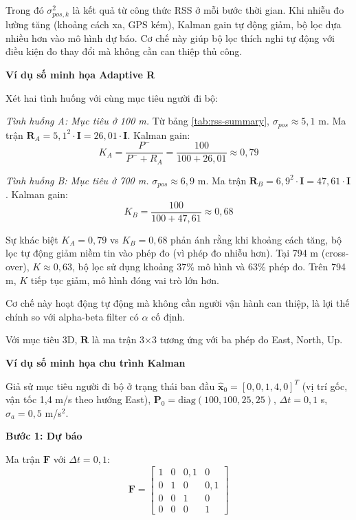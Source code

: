 Trong đó $\sigma_{pos,k}^2$ là kết quả từ công thức RSS ở mỗi bước thời gian. Khi nhiễu đo lường tăng (khoảng cách xa, GPS kém), Kalman gain tự động giảm, bộ lọc dựa nhiều hơn vào mô hình dự báo. Cơ chế này giúp bộ lọc thích nghi tự động với điều kiện đo thay đổi mà không cần can thiệp thủ công.

\textbf{Ví dụ số minh họa Adaptive R}

Xét hai tình huống với cùng mục tiêu người đi bộ:

\textit{Tình huống A: Mục tiêu ở 100 m.} Từ bảng \ref{tab:rss-summary}, $\sigma_{pos} \approx 5{,}1$ m. Ma trận $\mathbf{R}_A = 5{,}1^2 \cdot \mathbf{I} = 26{,}01 \cdot \mathbf{I}$. Kalman gain:
\begin{equation}
    K_A = \frac{P^-}{P^- + R_A} = \frac{100}{100 + 26{,}01} \approx 0{,}79
\end{equation}

\textit{Tình huống B: Mục tiêu ở 700 m.} $\sigma_{pos} \approx 6{,}9$ m. Ma trận $\mathbf{R}_B = 6{,}9^2 \cdot \mathbf{I} = 47{,}61 \cdot \mathbf{I}$. Kalman gain:
\begin{equation}
    K_B = \frac{100}{100 + 47{,}61} \approx 0{,}68
\end{equation}

Sự khác biệt $K_A = 0{,}79$ vs $K_B = 0{,}68$ phản ánh rằng khi khoảng cách tăng, bộ lọc tự động giảm niềm tin vào phép đo (vì phép đo nhiễu hơn). Tại 794 m (cross-over), $K \approx 0{,}63$, bộ lọc sử dụng khoảng 37\% mô hình và 63\% phép đo. Trên 794 m, $K$ tiếp tục giảm, mô hình đóng vai trò lớn hơn.

Cơ chế này hoạt động tự động mà không cần người vận hành can thiệp, là lợi thế chính so với alpha-beta filter có $\alpha$ cố định.

Với mục tiêu 3D, $\mathbf{R}$ là ma trận 3×3 tương ứng với ba phép đo East, North, Up.

\textbf{Ví dụ số minh họa chu trình Kalman}

Giả sử mục tiêu người đi bộ ở trạng thái ban đầu $\hat{\mathbf{x}}_0 = [0, 0, 1{,}4, 0]^T$ (vị trí gốc, vận tốc 1,4 m/s theo hướng East), $\mathbf{P}_0 = \text{diag}(100, 100, 25, 25)$, $\Delta t = 0{,}1$ s, $\sigma_a = 0{,}5$ m/s$^2$.

\textbf{Bước 1: Dự báo}

Ma trận $\mathbf{F}$ với $\Delta t = 0{,}1$:
\begin{equation}
    \mathbf{F} = \begin{bmatrix} 1 & 0 & 0{,}1 & 0 \\ 0 & 1 & 0 & 0{,}1 \\ 0 & 0 & 1 & 0 \\ 0 & 0 & 0 & 1 \end{bmatrix}
\end{equation}

